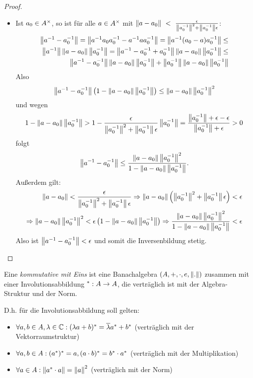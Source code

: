 \begin{proof}
\begin{itemize}
\item Ist $a_0 \in A^\times$, so ist für alle $a \in A^\times$ mit $\left\lVert a-a_0\right\rVert~<~\frac{\epsilon}{\left\lVert a_0^{-1}\right\rVert^2+\left\lVert a_0^{-1}\right\rVert\epsilon}$:
	\begin{align*}
	\left\lVert a^{-1}-a_0^{-1}\right\rVert = \left\lVert a^{-1}a_0a_0^{-1}-a^{-1}aa_0^{-1}\right\rVert = \left\lVert a^{-1}(a_0-a)a_0^{-1}\right\rVert \leq \\
	\left\lVert a^{-1}\right\rVert\left\lVert a-a_0\right\rVert\left\lVert a_0^{-1}\right\rVert = \left\lVert a^{-1}-a_0^{-1}+a_0^{-1}\right\rVert\left\lVert a-a_0\right\rVert\left\lVert a_0^{-1}\right\rVert \leq \\
	\left\lVert a^{-1}-a_0^{-1}\right\rVert\left\lVert a-a_0\right\rVert\left\lVert a_0^{-1}\right\rVert + \left\lVert a_0^{-1}\right\rVert\left\lVert a-a_0\right\rVert\left\lVert a_0^{-1}\right\rVert
	\end{align*}
Also
	\[\left\lVert a^{-1}-a_0^{-1}\right\rVert\left(1 - \left\lVert a-a_0\right\rVert\left\lVert a_0^{-1}\right\rVert\right) \leq \left\lVert a-a_0\right\rVert\left\lVert a_0^{-1}\right\rVert^2\]
und wegen
	\[1-\left\lVert a-a_0\right\rVert\left\lVert a_0^{-1}\right\rVert > 1 - \frac{\epsilon}{\left\lVert a_0^{-1}\right\rVert^2+\left\lVert a_0^{-1}\right\rVert\epsilon} \left\lVert a_0^{-1}\right\rVert = \frac{\left\lVert a_0^{-1}\right\rVert + \epsilon - \epsilon}{\left\lVert a_0^{-1}\right\rVert+\epsilon} > 0\]
folgt
	\[\left\lVert a^{-1}-a_0^{-1}\right\rVert \leq \frac{\left\lVert a-a_0\right\rVert\left\lVert a_0^{-1}\right\rVert^2}{1 - \left\lVert a-a_0\right\rVert\left\lVert a_0^{-1}\right\rVert}.\]
Außerdem gilt:
	\begin{align*}
	\left\lVert a-a_0\right\rVert < \frac{\epsilon}{\left\lVert a_0^{-1}\right\rVert^2+\left\lVert a_0^{-1}\right\rVert\epsilon} 
	\Rightarrow \left\lVert a-a_0\right\rVert\left(\left\lVert a_0^{-1}\right\rVert^2+\left\lVert a_0^{-1}\right\rVert\epsilon\right) < \epsilon \\ 
	\Rightarrow \left\lVert a-a_0\right\rVert\left\lVert a_0^{-1}\right\rVert^2 < \epsilon\left(1-\left\lVert a-a_0\right\rVert\left\lVert a_0^{-1}\right\rVert\right) 
	\Rightarrow \frac{\left\lVert a-a_0\right\rVert\left\lVert a_0^{-1}\right\rVert^2}{1-\left\lVert a-a_0\right\rVert\left\lVert a_0^{-1}\right\rVert} < \epsilon
	\end{align*}
Also ist $\left\lVert a^{-1}-a_0^{-1}\right\rVert< \epsilon$ und somit die Inversenbildung stetig.

\end{itemize}
\end{proof}

\begin{defn}[C*-Algebra]
Eine \emph{kommutative \CAlg{} mit Eins} ist eine Banachalgebra $(A, +, \cdot, e, \left\lVert.\right\rVert)$ zusammen mit einer Involutionsabbildung $^*:A \to A$, die verträglich ist mit der Algebra-Struktur und der Norm.

D.h. für die Involutionsabbildung soll gelten:
\begin{itemize}
	\item $\forall a,b \in A, \lambda \in \mathbb{C}: (\lambda a + b)^* = \overline{\lambda}a^* + b^*$ (verträglich mit der  Vektorraumstruktur)
	\item $\forall a,b \in A: (a^*)^* = a, (a\cdot b)^* = b^*\cdot a^*$ (verträglich mit der Multiplikation)
	\item $\forall a \in A: \left\lVert a^*\cdot a\right\rVert = \left\lVert a\right\rVert^2$ (verträglich mit der Norm)
\end{itemize}
\end{defn}

